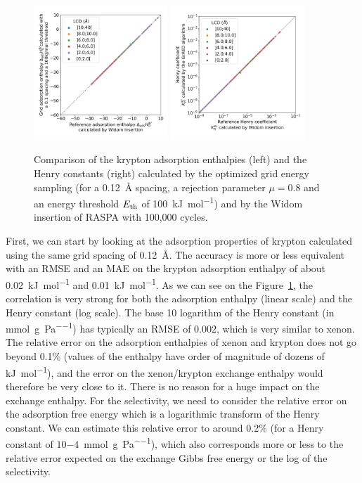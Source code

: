 \documentclass[main]{subfiles}
\begin{document}
\begin{figure}[ht]
  \centering
    \includegraphics[width=0.45\textwidth]{figures/3-fastsim/H_Kr_0_widom_vs_H_Kr_grid_overview.jpg}
    \includegraphics[width=0.45\textwidth]{figures/3-fastsim/K_Kr_widom_vs_K_Kr_grid_overview.jpg}
    \caption{Comparison of the krypton adsorption enthalpies (left) and the Henry constants (right) calculated by the optimized grid energy sampling (for a \SI{0.12}{\angstrom} spacing, a rejection parameter $\mu=0.8$ and an energy threshold $E_{\text{th}}$ of \SI{100}{\kilo\joule\per\mole}) and by the Widom insertion of RASPA with 100,000 cycles. }\label{fgr:grid_widom_kr}
\end{figure}

First, we can start by looking at the adsorption properties of krypton calculated using the same grid spacing of \SI{0.12}{\angstrom}. The accuracy is more or less equivalent with an RMSE and an MAE on the krypton adsorption enthalpy of about \SI{0.02}{\kilo\joule\per\mole} and \SI{0.01}{\kilo\joule\per\mole}. As we can see on the Figure~\ref{fgr:grid_widom_kr}, the correlation is very strong for both the adsorption enthalpy (linear scale) and the Henry constant (log scale). The base 10 logarithm of the Henry constant (in \si{\milli\mole\per\gram\per\pascal}) has typically an RMSE of $0.002$, which is very similar to xenon. The relative error on the adsorption enthalpies of xenon and krypton does not go beyond {0.1\%} (values of the enthalpy have order of magnitude of dozens of \si{\kilo\joule\per\mole}), and the error on the xenon/krypton exchange enthalpy would therefore be very close to it. There is no reason for a huge impact on the exchange enthalpy. For the selectivity, we need to consider the relative error on the adsorption free energy which is a logarithmic transform of the Henry constant. We can estimate this relative error to around {0.2\%} (for a Henry constant of $10{-4}$~\si{\milli\mole\per\gram\per\pascal}), which also corresponds more or less to the relative error expected on the exchange Gibbs free energy or the log of the selectivity.
\end{document}
